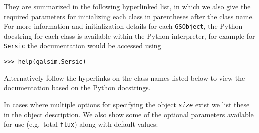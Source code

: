 \documentclass[preprint,10pt]{../../devel/modules/aastex}
\begin{document}
They are summarized in the following hyperlinked list, in which we also give
the required parameters for initializing each class in parentheses
after the class name.  For more information and initialization details for each \texttt{GSObject},
the Python docstring for each class is available within the Python interpreter, for example for
\texttt{Sersic} the documentation would be accessed using

\texttt{>>> help(galsim.Sersic)}

Alternatively follow the hyperlinks on
the class names listed below to view the documentation based
on the Python docstrings.

In cases where multiple options for specifying the object \emph{\texttt{size}}
exist we list these in the object description. We also show some of the optional
parameters available for use (e.g.\ total \texttt{flux}) along with default values:
\end{document}
